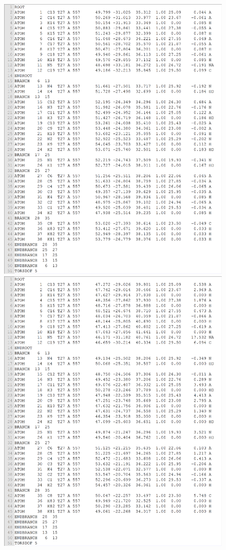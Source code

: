 \documentclass[twocolumn]{svjour3}          %
\begin{document}
\begin{figure}
\centering
\includegraphics[width=1.36\textwidth,natwidth=1899,natheight=2350]{../usrt/T27CrystalPDBQT.png}
\endminipage
{}
\centering
\includegraphics[width=1.36\textwidth,natwidth=1899,natheight=2350]{../usrt/T27DockedPDBQT.png}

\end{figure}
\end{document}
